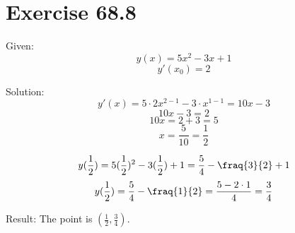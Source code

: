 \documentclass[a4paper, 10pt]{scrartcl}
\begin{document}
\section{Exercise 68.8}

Given:
\[y(x) = 5x^{2} - 3x + 1\]
\[y'(x_{0}) = 2\]

Solution:
\[y'(x) = 5\cdot2 x^{2 - 1} - 3\cdot x^{1 - 1} = 10x - 3\]
\[10x - 3 = 2\]
\[10x = 2 + 3 = 5\]
\[x = \frac{5}{10} = \frac{1}{2}\]

\[y(\frac{1}{2}) = 5(\frac{1}{2})^{2} - 3(\frac{1}{2}) + 1 =
                   \frac{5}{4} - \fraq{3}{2} + 1\]
\[y(\frac{1}{2}) = \frac{5}{4} - \fraq{1}{2} = \frac{5 - 2\cdot1}{4} = \frac{3}{4}\]

Result:
The point is $(\frac{1}{2}, \frac{3}{4})$.
\end{document}
